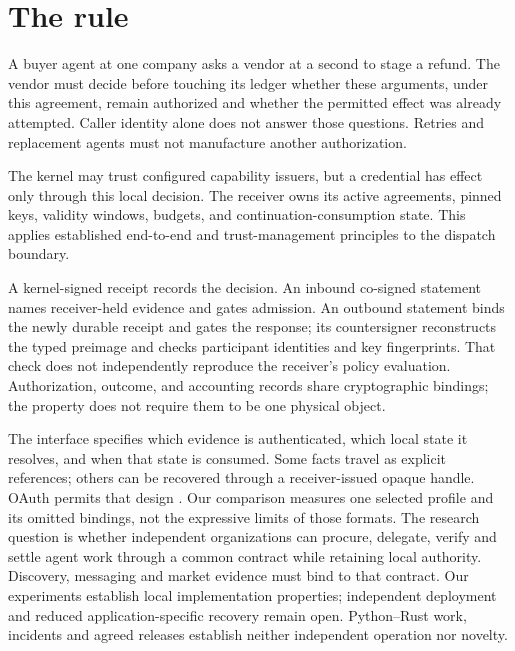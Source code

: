 \section{The rule}

A buyer agent at one company asks a vendor at a second to stage a refund.
The vendor must decide before touching its ledger whether these arguments,
under this agreement, remain authorized and whether the permitted effect was
already attempted. Caller identity alone does not answer those questions.
Retries and replacement agents must not manufacture another authorization.

The kernel may trust configured capability issuers, but a credential has effect
only through this local decision. The receiver owns its active agreements,
pinned keys, validity windows, budgets, and continuation-consumption state.
This applies established end-to-end and trust-management principles
\cite{saltzer1984,keynote,howell2000} to the dispatch boundary.

A kernel-signed receipt records the decision. An inbound co-signed statement
names receiver-held evidence and gates admission. An outbound statement binds
the newly durable receipt and gates the response; its countersigner reconstructs
the typed preimage and checks participant identities and key fingerprints.
That check does not independently reproduce the receiver's policy evaluation.
Authorization, outcome, and accounting records share cryptographic bindings;
the property does not require them to be one physical object.

The interface specifies which evidence is authenticated, which local state it
resolves, and when that state is consumed. Some facts travel as explicit
references; others can be recovered through a receiver-issued opaque handle.
OAuth permits that design \cite{rfc6749,rfc8693}. Our comparison measures one
selected profile and its omitted bindings, not the expressive limits of those
formats. The research question is whether independent organizations can
procure, delegate, verify and settle agent work through a common contract while
retaining local authority. Discovery, messaging and market evidence must bind
to that contract. Our experiments establish local implementation properties;
independent deployment and reduced application-specific recovery remain open.
Python--Rust work, incidents and agreed releases establish neither
independent operation nor novelty.

